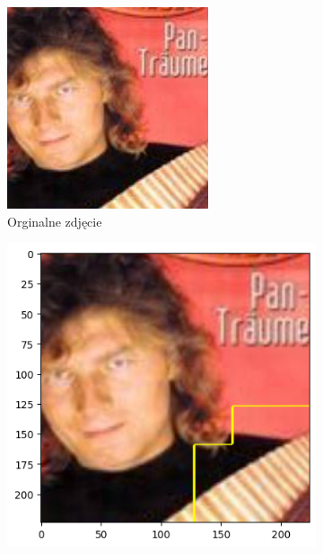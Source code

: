 \begin{figure}[h]
	\centering
	\begin{subfigure}[b]{0.3\textwidth}
		\includegraphics[width=.9\textwidth]{img/examples/appendix/n03884397_34878}
		\caption{Orginalne zdjęcie}  \label{}
	\end{subfigure}
	\begin{subfigure}[b]{0.3\textwidth}
		\centering\includegraphics[width=.9\textwidth]{img/examples/appendix/n03884397_34878_gradcam}

\end{subfigure}
\end{figure}

